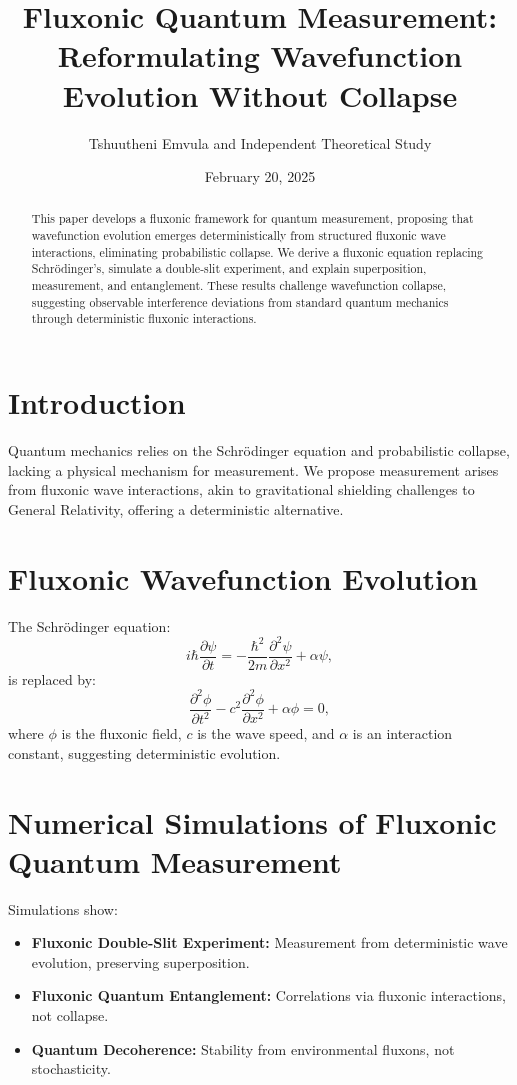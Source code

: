 \documentclass{article}
\title{Fluxonic Quantum Measurement: Reformulating Wavefunction Evolution Without Collapse}
\author{Tshuutheni Emvula and Independent Theoretical Study}
\date{February 20, 2025}
\begin{document}
\maketitle

\begin{abstract}
This paper develops a fluxonic framework for quantum measurement, proposing that wavefunction evolution emerges deterministically from structured fluxonic wave interactions, eliminating probabilistic collapse. We derive a fluxonic equation replacing Schrödinger’s, simulate a double-slit experiment, and explain superposition, measurement, and entanglement. These results challenge wavefunction collapse, suggesting observable interference deviations from standard quantum mechanics through deterministic fluxonic interactions.
\end{abstract}

\section{Introduction}
Quantum mechanics relies on the Schrödinger equation and probabilistic collapse, lacking a physical mechanism for measurement. We propose measurement arises from fluxonic wave interactions, akin to gravitational shielding challenges to General Relativity, offering a deterministic alternative.

\section{Fluxonic Wavefunction Evolution}
The Schrödinger equation:
\begin{equation}
i\hbar \frac{\partial \psi}{\partial t} = -\frac{\hbar^2}{2m} \frac{\partial^2 \psi}{\partial x^2} + \alpha \psi,
\end{equation}
is replaced by:
\begin{equation}
\frac{\partial^2 \phi}{\partial t^2} - c^2 \frac{\partial^2 \phi}{\partial x^2} + \alpha \phi = 0,
\end{equation}
where \(\phi\) is the fluxonic field, \(c\) is the wave speed, and \(\alpha\) is an interaction constant, suggesting deterministic evolution.

\section{Numerical Simulations of Fluxonic Quantum Measurement}
Simulations show:
\begin{itemize}
    \item \textbf{Fluxonic Double-Slit Experiment:} Measurement from deterministic wave evolution, preserving superposition.
    \item \textbf{Fluxonic Quantum Entanglement:} Correlations via fluxonic interactions, not collapse.
    \item \textbf{Quantum Decoherence:} Stability from environmental fluxons, not stochasticity.
\end{itemize}
\end{document}
